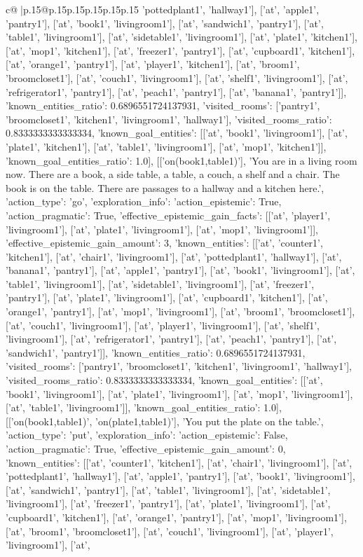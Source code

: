 \documentclass{article}
\begin{document}
{\begin{supertabular}{c@{$\;$}|p{.15\linewidth}@{}p{.15\linewidth}p{.15\linewidth}p{.15\linewidth}p{.15\linewidth}p{.15\linewidth}}
{{{'pottedplant1', 'hallway1'], ['at', 'apple1', 'pantry1'], ['at', 'book1', 'livingroom1'], ['at', 'sandwich1', 'pantry1'], ['at', 'table1', 'livingroom1'], ['at', 'sidetable1', 'livingroom1'], ['at', 'plate1', 'kitchen1'], ['at', 'mop1', 'kitchen1'], ['at', 'freezer1', 'pantry1'], ['at', 'cupboard1', 'kitchen1'], ['at', 'orange1', 'pantry1'], ['at', 'player1', 'kitchen1'], ['at', 'broom1', 'broomcloset1'], ['at', 'couch1', 'livingroom1'], ['at', 'shelf1', 'livingroom1'], ['at', 'refrigerator1', 'pantry1'], ['at', 'peach1', 'pantry1'], ['at', 'banana1', 'pantry1']], 'known_entities_ratio': 0.6896551724137931, 'visited_rooms': ['pantry1', 'broomcloset1', 'kitchen1', 'livingroom1', 'hallway1'], 'visited_rooms_ratio': 0.8333333333333334, 'known_goal_entities': [['at', 'book1', 'livingroom1'], ['at', 'plate1', 'kitchen1'], ['at', 'table1', 'livingroom1'], ['at', 'mop1', 'kitchen1']], 'known_goal_entities_ratio': 1.0}}], [['on(book1,table1)'], 'You are in a living room now. There are a book, a side table, a table, a couch, a shelf and a chair. The book is on the table. There are passages to a hallway and a kitchen here.', {'action_type': 'go', 'exploration_info': {'action_epistemic': True, 'action_pragmatic': True, 'effective_epistemic_gain_facts': [['at', 'player1', 'livingroom1'], ['at', 'plate1', 'livingroom1'], ['at', 'mop1', 'livingroom1']], 'effective_epistemic_gain_amount': 3, 'known_entities': [['at', 'counter1', 'kitchen1'], ['at', 'chair1', 'livingroom1'], ['at', 'pottedplant1', 'hallway1'], ['at', 'banana1', 'pantry1'], ['at', 'apple1', 'pantry1'], ['at', 'book1', 'livingroom1'], ['at', 'table1', 'livingroom1'], ['at', 'sidetable1', 'livingroom1'], ['at', 'freezer1', 'pantry1'], ['at', 'plate1', 'livingroom1'], ['at', 'cupboard1', 'kitchen1'], ['at', 'orange1', 'pantry1'], ['at', 'mop1', 'livingroom1'], ['at', 'broom1', 'broomcloset1'], ['at', 'couch1', 'livingroom1'], ['at', 'player1', 'livingroom1'], ['at', 'shelf1', 'livingroom1'], ['at', 'refrigerator1', 'pantry1'], ['at', 'peach1', 'pantry1'], ['at', 'sandwich1', 'pantry1']], 'known_entities_ratio': 0.6896551724137931, 'visited_rooms': ['pantry1', 'broomcloset1', 'kitchen1', 'livingroom1', 'hallway1'], 'visited_rooms_ratio': 0.8333333333333334, 'known_goal_entities': [['at', 'book1', 'livingroom1'], ['at', 'plate1', 'livingroom1'], ['at', 'mop1', 'livingroom1'], ['at', 'table1', 'livingroom1']], 'known_goal_entities_ratio': 1.0}}], [['on(book1,table1)', 'on(plate1,table1)'], 'You put the plate on the table.', {'action_type': 'put', 'exploration_info': {'action_epistemic': False, 'action_pragmatic': True, 'effective_epistemic_gain_amount': 0, 'known_entities': [['at', 'counter1', 'kitchen1'], ['at', 'chair1', 'livingroom1'], ['at', 'pottedplant1', 'hallway1'], ['at', 'apple1', 'pantry1'], ['at', 'book1', 'livingroom1'], ['at', 'sandwich1', 'pantry1'], ['at', 'table1', 'livingroom1'], ['at', 'sidetable1', 'livingroom1'], ['at', 'freezer1', 'pantry1'], ['at', 'plate1', 'livingroom1'], ['at', 'cupboard1', 'kitchen1'], ['at', 'orange1', 'pantry1'], ['at', 'mop1', 'livingroom1'], ['at', 'broom1', 'broomcloset1'], ['at', 'couch1', 'livingroom1'], ['at', 'player1', 'livingroom1'], ['at', }}}
\end{supertabular}}
\end{document}
